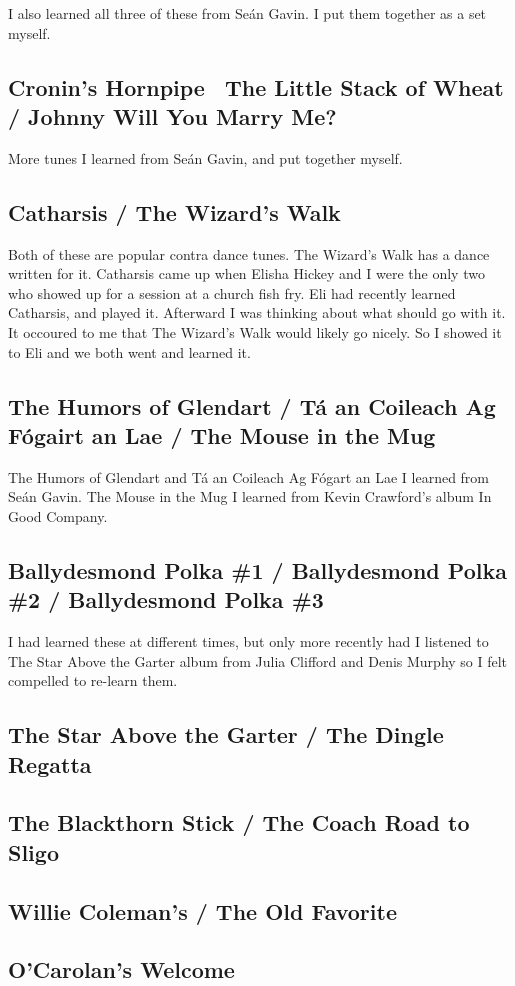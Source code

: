 \documentclass[11pt,letterpaper]{article}
\begin{document}
I also learned all three of these from Se\'an Gavin. I put them together as a set myself.

\subsection*{Cronin's Hornpipe \ The Little Stack of Wheat / Johnny Will You Marry Me?}

More tunes I learned from Se\'an Gavin, and put together myself.

\subsection*{Catharsis / The Wizard's Walk}

Both of these are popular contra dance tunes. The Wizard's Walk has a dance written for it. Catharsis came up when Elisha Hickey and I were the only two who showed up for a session at a church fish fry. Eli had recently learned Catharsis, and played it. Afterward I was thinking about what should go with it. It occoured to me that The Wizard's Walk would likely go nicely. So I showed it to Eli and we both went and learned it. 

\subsection*{The Humors of Glendart / T\'a an Coileach Ag F\'ogairt an Lae / The Mouse in the Mug}

The Humors of Glendart and T\'a an Coileach Ag F\'ogart an Lae I learned from Se\'an Gavin. The Mouse in the Mug I learned from Kevin Crawford's album In Good Company. 

\subsection*{Ballydesmond Polka \#1 / Ballydesmond Polka \#2 / Ballydesmond Polka \#3}

I had learned these at different times, but only more recently had I listened to The Star Above the Garter album from Julia Clifford and Denis Murphy so I felt compelled to re-learn them.

\subsection*{The Star Above the Garter / The Dingle Regatta}
\subsection*{The Blackthorn Stick / The Coach Road to Sligo}
\subsection*{Willie Coleman's / The Old Favorite}
\subsection*{O'Carolan's Welcome}
\end{document}
